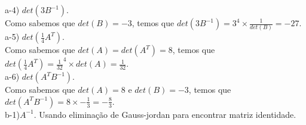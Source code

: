 a-4) $det(3B^{-1})$.
\\

Como sabemos que $det(B) = -3$, temos que \textcolor{COLOR2}{$det(3B^{-1}) = 3^4\times \frac{1}{det(B)} = -27$}.\\

a-5) $det(\frac{1}{4}A^T)$.
\\

Como sabemos que $det(A) =det(A^T) = 8$, temos que \textcolor{COLOR2}{$det(\frac{1}{4}A^T) ={\frac{1}{32}}^4 \times det(A) = \frac{1}{32}$}.\\

a-6) $det(A^TB^{-1})$.
\\

Como sabemos que $det(A) = 8$ e $det(B) = -3$, temos que \textcolor{COLOR2}{$det(A^TB^{-1})=8\times -\frac{1}{3} = -\frac{8}{3}$}.\\

b-1)$A^{-1}$. Usando eliminação de Gauss-jordan para encontrar matriz identidade.
\\

